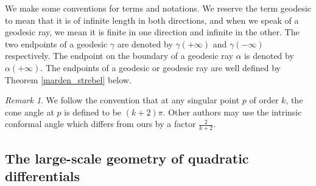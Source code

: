 \documentclass{amsart}
\theoremstyle{plain}
\theoremstyle{definition}
\theoremstyle{remark}
\newtheorem*{Remark*}{Remark}
\begin{document}
% 
% 
We make some conventions for terms and notations.  We reserve the term geodesic to mean that it is of infinite length in both directions, and when we speak of a geodesic ray, we mean it is finite in one direction and infinite in the other.  The two endpoints of a geodesic $\gamma$ are denoted by $\gamma(+\infty)$ and $\gamma(-\infty)$ respectively.  The endpoint on the boundary of a geodesic ray $\alpha$ is denoted by $\alpha(+\infty)$.  The endpoints of a geodesic or geodesic ray are well defined by Theorem \ref{marden_strebel} below.
% 
\begin{Remark*}
We follow the convention that at any singular point $p$ of order $k$, the cone angle at $p$ is defined to be $(k+2)\pi$.  Other authors may use the intrinsic conformal angle which differs from ours by a factor $\frac{2}{k+2}$. \par
\end{Remark*}
\subsection{The large-scale geometry of quadratic differentials}
\end{document}
